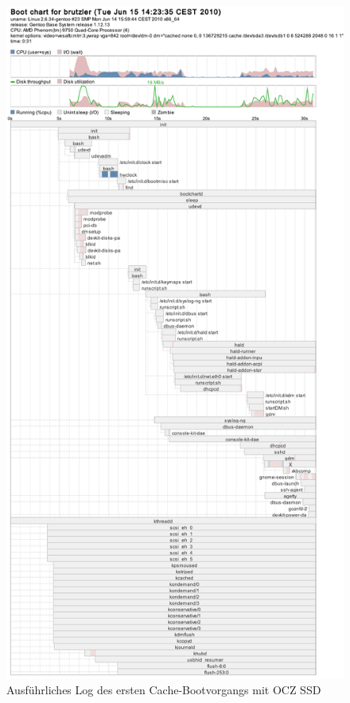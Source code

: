\begin{figure}[H]\centering
	\includegraphics[scale=0.4]{figures/appendix/bootchart-cache1}
    \caption{Ausführliches Log des ersten Cache-Bootvorgangs mit OCZ SSD}
    \label{img:bootchart-cache1}
\end{figure}

